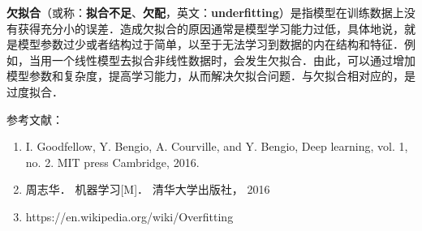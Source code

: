
\textbf{欠拟合}（或称：\textbf{拟合不足}、\textbf{欠配}，英文：\textbf{underfitting}）是指模型在训练数据上没有获得充分小的误差．造成欠拟合的原因通常是模型学习能力过低，具体地说，就是模型参数过少或者结构过于简单，以至于无法学习到数据的内在结构和特征．例如，当用一个线性模型去拟合非线性数据时，会发生欠拟合．由此，可以通过增加模型参数和复杂度，提高学习能力，从而解决欠拟合问题．与欠拟合相对应的，是过度拟合．



参考文献：
\begin{enumerate}
\item I. Goodfellow, Y. Bengio, A. Courville, and Y. Bengio, Deep learning, vol. 1, no. 2. MIT press Cambridge, 2016.
\item 周志华． 机器学习[M]． 清华大学出版社， 2016
\item https://en.wikipedia.org/wiki/Overfitting
\end{enumerate}